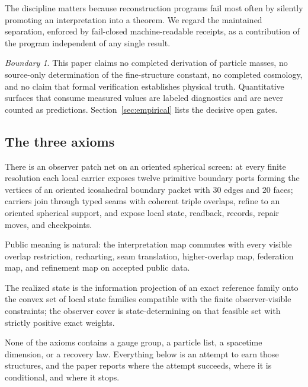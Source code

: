 \documentclass[11pt]{article}
\theoremstyle{remark}
\newtheorem{boundary}[theorem]{Boundary}
\begin{document}
The discipline matters because reconstruction programs fail most often by
silently promoting an interpretation into a theorem. We regard the
maintained separation, enforced by fail-closed machine-readable receipts,
as a contribution of the program independent of any single result.

\begin{boundary}
This paper claims no completed derivation of particle masses, no source-only
determination of the fine-structure constant, no completed cosmology, and no
claim that formal verification establishes physical truth. Quantitative
surfaces that consume measured values are labeled diagnostics and are never
counted as predictions. Section~\ref{sec:empirical} lists the decisive open
gates.
\end{boundary}

\subsection{The three axioms}

\begin{description}[leftmargin=1.6em]
\item[A1 (oriented twelve-port observer screen).] There is an observer patch
net on an oriented spherical screen: at every finite resolution each local
carrier exposes twelve primitive boundary ports forming the vertices of an
oriented icosahedral boundary packet with $30$ edges and $20$ faces; carriers
join through typed seams with coherent triple overlaps, refine to an oriented
spherical support, and expose local state, readback, records, repair moves,
and checkpoints.
\item[A2 (observer agreement).] Public meaning is natural: the interpretation
map commutes with every visible overlap restriction, recharting, seam
translation, higher-overlap map, federation map, and refinement map on
accepted public data.
\item[A3 (conditional maximum randomness).] The realized state is the
information projection of an exact reference family onto the convex set of
local state families compatible with the finite observer-visible
constraints; the observer cover is state-determining on that feasible set
with strictly positive exact weights.
\end{description}

None of the axioms contains a gauge group, a particle list, a spacetime
dimension, or a recovery law. Everything below is an attempt to earn those
structures, and the paper reports where the attempt succeeds, where it is
conditional, and where it stops.
\end{document}
